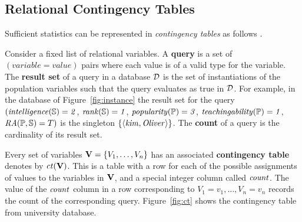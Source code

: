 \documentclass{acm_proc_article-sp}
\newcommand{\ct}{\mathit{ct}}
\begin{document}
\subsection{Relational Contingency Tables}
Sufficient statistics can be represented in {\em contingency tables} as follows \cite{Moore1998}. 



Consider a fixed list of relational variables.
A \textbf{query} is a set of $(variable = value)$ pairs where each value is of a valid type for the variable. 
The \textbf{result set} of a query in a database $\D$ is the set of instantiations of the population variables such that the query evaluates as true in $\D$.
For example, in the database of Figure~\ref{fig:instance} the result set for the query 
$(\it{intelligence}(\S) = 2$, $\it{rank}(\S) = 1$, $\it{popularity}(\P) = 3$, $\it{teachingability}(\P) = 1$, $\ra(\P,\S) = T)$ 
is the singleton $\{\langle \it{kim}, \it{Oliver}\rangle\}$. 
The \textbf{count} of a query is the cardinality of its result set. 

Every set of variables $\set{V} = \{\V_{1},\ldots,\V_{n} \}$ has an associated \textbf{contingency table} denotes by $\ct(\set{V})$. %
This is a table with a row for each of the possible assignments of values to the variables in $\set{V}$, and a special integer column called $\qcount$. 
The value of the $\qcount$ column in a row 
corresponding to $V_{1} = v_{1},\ldots,V_{n} = v_{n}$ records the count of the 
corresponding query. 
Figure~\ref{fig:ct} shows the contingency table from university database. 
\end{document}
